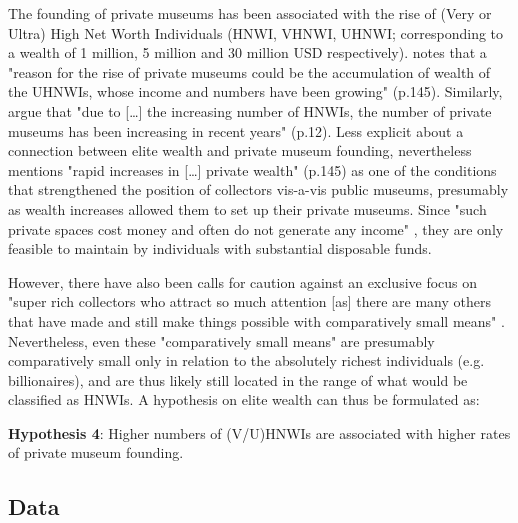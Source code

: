 \documentclass[11pt]{article}
\begin{document}
The founding of private museums has been associated with the rise of (Very or Ultra) High Net Worth Individuals (HNWI, VHNWI, UHNWI; corresponding to a wealth of 1 million, 5 million and 30 million USD respectively).
\textcite{Gnyp_2015_collectors} notes that a "reason for the rise of private museums could be the accumulation
of wealth of the UHNWIs, whose income and numbers have been growing" (p.145).
Similarly, \textcite{Zorloni_Resch_2016_opportunities} argue that "due to [\ldots{}] the increasing number of HNWIs, the number of private museums has been increasing in recent years" (p.12).
Less explicit about a connection between elite wealth and private museum founding, \textcite{Walker_2019_collector} nevertheless mentions "rapid increases in [\ldots{}] private wealth" (p.145) as one of the conditions that strengthened the position of collectors vis-a-vis public museums, presumably as wealth increases allowed them to set up their private museums. 
Since "such private spaces cost money and often do not generate any income" \parencite[p.145]{Gnyp_2015_collectors}, they are only feasible to maintain by individuals with substantial disposable funds. 



However, there have also been calls for caution against an exclusive focus on "super rich collectors who attract so much attention [as] there are many others that have made and still make things possible with comparatively small means" \parencite[p.12]{Bechtler_Imhof_2018_future}.
Nevertheless, even these "comparatively small means" are presumably comparatively small only in relation to the absolutely richest individuals (e.g. billionaires), and are thus likely still located in the range of what would be classified as HNWIs.
A hypothesis on elite wealth can thus be formulated as: 

\bigbreak
\noindent
\textbf{Hypothesis 4}: Higher numbers of (V/U)HNWIs are associated with higher rates of private museum founding.




\subsection*{Data}
\end{document}
